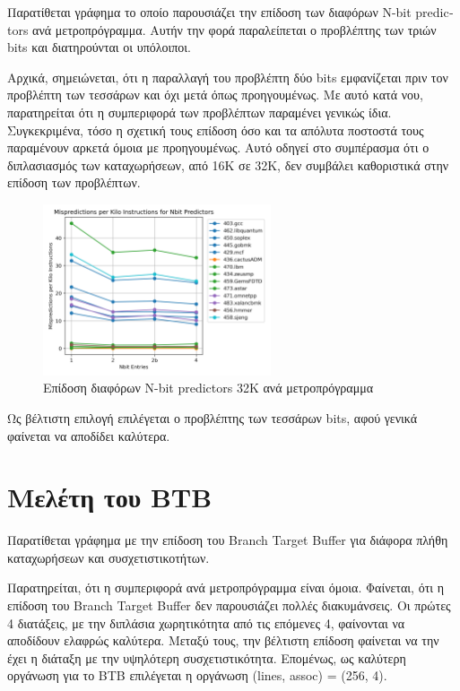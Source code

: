 \documentclass{article}
\newcommand{\eng}[1]{\foreignlanguage{english}{#1}}
\begin{document}
Παρατίθεται γράφημα το οποίο παρουσιάζει την επίδοση των διαφόρων \eng{N-bit predictors} ανά μετροπρόγραμμα. Αυτήν την φορά παραλείπεται ο προβλέπτης των τριών \eng{bits} και διατηρούνται οι υπόλοιποι.

Αρχικά, σημειώνεται, ότι η παραλλαγή του προβλέπτη δύο \eng{bits} εμφανίζεται πριν τον προβλέπτη των τεσσάρων και όχι μετά όπως προηγουμένως. Με αυτό κατά νου, παρατηρείται ότι η συμπεριφορά των προβλέπτων παραμένει γενικώς ίδια. Συγκεκριμένα, τόσο η σχετική τους επίδοση όσο και τα απόλυτα ποστοστά τους παραμένουν αρκετά όμοια με προηγουμένως. Αυτό οδηγεί στο συμπέρασμα ότι ο διπλασιασμός των καταχωρήσεων, από 16Κ σε 32Κ, δεν συμβάλει καθοριστικά στην επίδοση των προβλέπτων. 

\begin{figure}[h]
    \centering
    \includegraphics[width=0.6\textwidth]{./outputs/nbit32k.png} 
    \caption{Επίδοση διαφόρων \eng{N-bit predictors 32K} ανά μετροπρόγραμμα}
    \label{fig:nbit32k}
\end{figure}
\FloatBarrier

Ως βέλτιστη επιλογή επιλέγεται ο προβλέπτης των τεσσάρων \eng{bits}, αφού γενικά φαίνεται να αποδίδει καλύτερα. 

\clearpage
\section{Μελέτη του \eng{BTB}}

Παρατίθεται γράφημα με την επίδοση του \eng{Branch Target Buffer} για διάφορα πλήθη καταχωρήσεων και συσχετιστικοτήτων.

Παρατηρείται, ότι η συμπεριφορά ανά μετροπρόγραμμα είναι όμοια. Φαίνεται, ότι η επίδοση του \eng{Branch Target Buffer} δεν παρουσιάζει πολλές διακυμάνσεις. Οι πρώτες 4 διατάξεις, με την διπλάσια χωρητικότητα από τις επόμενες 4, φαίνονται να αποδίδουν ελαφρώς καλύτερα. Μεταξύ τους, την βέλτιστη επίδοση φαίνεται να την έχει η διάταξη με την υψηλότερη συσχετιστικότητα. Επομένως, ως καλύτερη οργάνωση για το \eng{BTB} επιλέγεται η οργάνωση \eng{(lines, assoc) = (256, 4)}.
\end{document}
